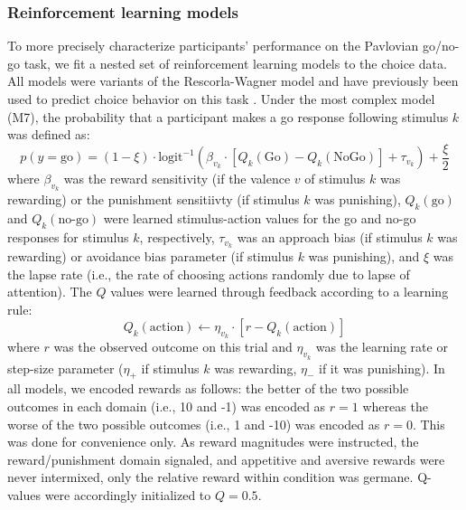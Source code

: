 \documentclass[a4paper,12pt]{article}
\begin{document}
\begin{refsection}[main]
\subsubsection*{Reinforcement learning models}

To more precisely characterize participants' performance on the Pavlovian go/no-go task, we fit a nested set of reinforcement learning models to the choice data.  All models were variants of the Rescorla-Wagner model and have previously been used to predict choice behavior on this task \cite{guitart2012go, mkrtchian2017modeling, moutoussis2018change, swart2017catecholaminergic}. Under the most complex model (M7), the probability that a participant makes a go response following stimulus $k$ was defined as:
\begin{equation}
    p(y = \text{go}) = (1 - \xi) \cdot \text{logit}^{-1} \left( \beta_{v_k} \cdot [Q_k(\text{Go}) - Q_k(\text{NoGo})] + \tau_{v_k} \right) + \frac{\xi}{2}
\end{equation}
where $\beta_{v_k}$ was the reward sensitivity (if the valence $v$ of stimulus $k$ was rewarding) or the punishment sensitiivty (if stimulus $k$ was punishing), $Q_k(\text{go})$ and $Q_k(\text{no-go})$ were learned stimulus-action values for the go and no-go responses for stimulus $k$, respectively, $\tau_{v_k}$ was an approach bias (if stimulus $k$ was rewarding) or avoidance bias parameter (if stimulus $k$ was punishing), and $\xi$ was the lapse rate (i.e., the rate of choosing actions randomly due to lapse of attention). The $Q$ values were learned through feedback according to a learning rule:
\begin{equation}
    Q_k(\text{action}) \leftarrow \eta_{v_k} \cdot \left[ r - Q_k(\text{action}) \right]
\end{equation}
where $r$ was the observed outcome on this trial and $\eta_{v_k}$ was the learning rate or step-size parameter ($\eta_+$ if stimulus $k$ was rewarding, $\eta_-$ if it was punishing). In all models, we encoded rewards as follows: the better of the two possible outcomes in each domain (i.e., 10 and -1) was encoded as $r=1$ whereas the worse of the two possible outcomes (i.e., 1 and -10) was encoded as $r=0$. This was done for convenience only. As reward magnitudes were instructed, the reward/punishment domain signaled, and appetitive and aversive rewards were never intermixed, only the relative reward within condition was germane. Q-values were accordingly initialized to $Q = 0.5$. 


\end{refsection}
\end{document}
